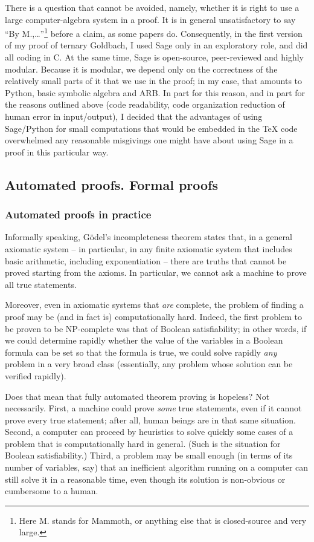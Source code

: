 There is a question that cannot be avoided, namely, whether
it is right to use a large computer-algebra system in a proof. It is in
general unsatisfactory to say ``By M.,\dots''\footnote{Here
  M. stands for Mammoth, or anything else that is closed-source and very large.} before a claim, as some
papers do. Consequently, in the first version of my proof of ternary
Goldbach, I used Sage only in an exploratory role, and did all coding in C.
At the same time, Sage is open-source, peer-reviewed and highly modular.
Because it is modular, we depend only on the correctness of the relatively
small parts of it that we use in the proof; in my case, that amounts to
Python, basic symbolic algebra and ARB.
In part for this reason, and in part for the reasons outlined above
(code readability, code organization reduction of human error in input/output),
I decided that the advantages of using Sage/Python for small computations
that would be embedded in the TeX code overwhelmed any reasonable misgivings
one might have about using Sage in a proof in this particular way.

\subsection{Automated proofs. Formal proofs}

\subsubsection{Automated proofs in practice}

Informally speaking,
G\"odel's incompleteness theorem states that, in a general axiomatic
system -- in particular, in any finite axiomatic system that includes basic
arithmetic, including exponentiation -- there are truths that cannot be proved
starting from the axioms. In particular, we cannot ask a machine to prove
all true statements.

Moreover, even in axiomatic systems that {\em are} complete, the problem
of finding a proof may be (and in fact is) computationally hard. Indeed,
the first problem to be proven to be NP-complete was that of Boolean
satisfiability; in other words, if we could determine rapidly whether the
value of the variables in a Boolean formula can be set so that the formula
is true, we could solve rapidly
{\em any} problem in a very broad class (essentially, any problem whose
solution can be verified rapidly).

Does that mean that fully automated theorem proving is hopeless? Not
necessarily. First, a machine could prove {\em some} true statements,
even if it cannot prove every true statement; after all, human beings are in
that same situation. Second, a computer can proceed by heuristics to solve
quickly some cases of a problem that is computationally hard in general.
(Such is the situation for Boolean satisfiability.)
Third, a problem may be small enough (in terms of its number of variables, say)
that an inefficient algorithm running on a computer can still solve it in a
reasonable time, even though its solution is non-obvious or cumbersome to a
human.

